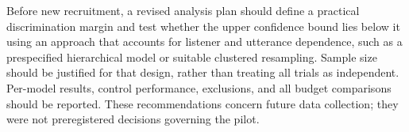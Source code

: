 \documentclass[11pt,a4paper]{article}
\begin{document}
Before new recruitment, a revised analysis plan should define a practical discrimination margin and test whether the upper confidence bound lies below it using an approach that accounts for listener and utterance dependence, such as a prespecified hierarchical model or suitable clustered resampling. Sample size should be justified for that design, rather than treating all trials as independent. Per-model results, control performance, exclusions, and all budget comparisons should be reported. These recommendations concern future data collection; they were not preregistered decisions governing the pilot.
\end{document}
